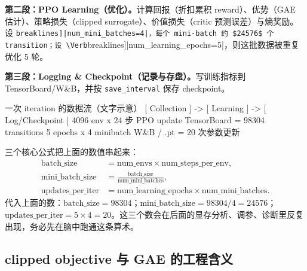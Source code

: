 \textbf{第二段：PPO Learning（优化）。}计算回报（折扣累积 reward）、优势（GAE 估计）、策略损失（clipped surrogate）、价值损失（critic 预测误差）与熵奖励。设 \Verb[breaklines]|num_mini_batches=4|，每个 mini-batch 约 $24576$ 个 transition；设 \Verb[breaklines]|num_learning_epochs=5|，则这批数据被重复优化 5 轮。

\textbf{第三段：Logging \& Checkpoint（记录与存盘）。}写训练指标到 TensorBoard/W\&B，并按 \verb|save_interval| 保存 checkpoint。

\begin{codebox}{一次 iteration 的数据流（文字示意）}
[ Collection ]      ->   [ Learning ]        ->   [ Log/Checkpoint ]
 4096 env x 24 步         PPO update                TensorBoard
 = 98304 transitions     5 epochs x 4 minibatch    W&B / .pt
                         = 20 次参数更新
\end{codebox}

三个核心公式把上面的数值串起来：
\begin{align}
\text{batch\_size} &= \text{num\_envs}\times\text{num\_steps\_per\_env}, \label{eq:rlmc-batch}\\
\text{mini\_batch\_size} &= \frac{\text{batch\_size}}{\text{num\_mini\_batches}}, \label{eq:rlmc-minibatch}\\
\text{updates\_per\_iter} &= \text{num\_learning\_epochs}\times\text{num\_mini\_batches}. \label{eq:rlmc-updates}
\end{align}
代入上面的数：$\text{batch\_size}=98304$；$\text{mini\_batch\_size}=98304/4=24576$；$\text{updates\_per\_iter}=5\times4=20$。这三个数会在后面的显存分析、调参、诊断里反复出现，务必先在脑中跑通这条算术。


\subsection{clipped objective 与 GAE 的工程含义}

